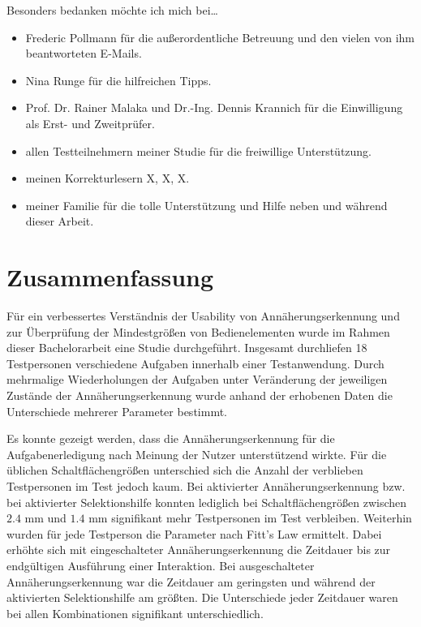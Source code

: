 \documentclass[12pt,bibliography=totocnumbered,listof=totocnumbered,abstracton]{scrreprt}
\begin{document}
Besonders bedanken möchte ich mich bei\dots
\begin{itemize}
\item Frederic Pollmann für die außerordentliche Betreuung und den vielen von ihm beantworteten E-Mails.
\item Nina Runge für die hilfreichen Tipps.
\item Prof. Dr. Rainer Malaka und Dr.-Ing. Dennis Krannich für die Einwilligung als Erst- und Zweitprüfer.
\item allen Testteilnehmern meiner Studie für die freiwillige Unterstützung.
\item meinen Korrekturlesern X, X, X.
\item meiner Familie für die tolle Unterstützung und Hilfe neben und während dieser Arbeit.
\end{itemize}

\chapter*{Zusammenfassung}
Für ein verbessertes Verständnis der Usability von Annäherungserkennung und zur Überprüfung der Mindestgrößen von Bedienelementen wurde im Rahmen dieser Bachelorarbeit eine Studie durchgeführt. Insgesamt durchliefen 18 Testpersonen verschiedene Aufgaben innerhalb einer Testanwendung. Durch mehrmalige Wiederholungen der Aufgaben unter Veränderung der jeweiligen Zustände der Annäherungserkennung wurde anhand der erhobenen Daten die Unterschiede mehrerer Parameter bestimmt.

Es konnte gezeigt werden, dass die Annäherungserkennung für die Aufgabenerledigung nach Meinung der Nutzer unterstützend wirkte. Für die üblichen Schaltflächengrößen unterschied sich die Anzahl der verblieben Testpersonen im Test jedoch kaum. Bei aktivierter Annäherungserkennung bzw. bei aktivierter Selektionshilfe konnten lediglich bei Schaltflächengrößen zwischen $2.4$ mm  und $1.4$ mm signifikant mehr Testpersonen im Test verbleiben. Weiterhin wurden für jede Testperson die Parameter nach Fitt's Law ermittelt. Dabei erhöhte sich mit eingeschalteter Annäherungserkennung die Zeitdauer bis zur endgültigen Ausführung einer Interaktion. Bei ausgeschalteter Annäherungserkennung war die Zeitdauer am geringsten und während der aktivierten Selektionshilfe am größten. Die Unterschiede jeder Zeitdauer waren bei allen Kombinationen signifikant unterschiedlich.

\pagestyle{scrheadings}
\end{document}
